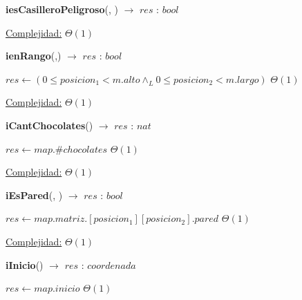 \documentclass{book}
\begin{document}
\begin{Algoritmos}
\begin{algorithm}[H]{\textbf{iesCasilleroPeligroso}(, ) $\to$ $res$ : $bool$}
\begin{algorithmic}[1]
		\medskip
		\Statex \underline{Complejidad:} $\Theta(1)$
		\end{algorithmic}
	\end{algorithm}




        
    \begin{algorithm}[H]{\textbf{ienRango}(,) $\to$ $res$ : $bool$}
	\begin{algorithmic}[1]
		\State $res \gets (0\leq posicion_1< m.alto \wedge_L  0\leq posicion_2<m.largo)$                                                                 \Comment $\Theta(1)$
		
		\medskip
		\Statex \underline{Complejidad:} $\Theta(1)$
	\end{algorithmic}
\end{algorithm}




    \begin{algorithm}[H]{\textbf{iCantChocolates}() $\to$ $res$ : $nat$}
        \begin{algorithmic}[1]
                \State $res \gets map.\#chocolates$                                                                   \Comment $\Theta(1)$

                \medskip
                \Statex \underline{Complejidad:} $\Theta(1)$
            \end{algorithmic}
    \end{algorithm}

    \begin{algorithm}[H]{\textbf{iEsPared}(, ) $\to$ $res$ : $bool$}
        \begin{algorithmic}[1]
                \State $res \gets map.matriz.[posicion_1][posicion_2].pared$                                                                 \Comment $\Theta(1)$

                \medskip
                \Statex \underline{Complejidad:} $\Theta(1)$
            \end{algorithmic}
    \end{algorithm}

    \begin{algorithm}[H]{\textbf{iInicio}() $\to$ $res$ : $coordenada$}
        \begin{algorithmic}[1]
                \State $res \gets map.inicio$                                                               \Comment $\Theta(1)$


\end{algorithmic}
\end{algorithm}
\end{Algoritmos}
\end{document}
